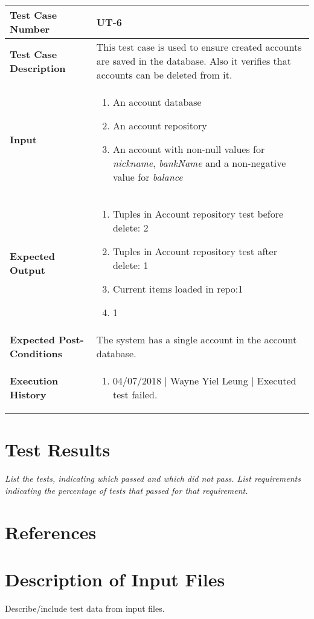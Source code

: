\documentclass[12pt]{article}
\begin{document}
\begin{table}[htbp]
\centering
\label{UT-6}
\begin{tabularx}{\textwidth}{ | l | X |}
\hline
\textbf{Test Case Number}      &  UT-6                      \\ \hline
\textbf{Test Case Description}    &  This test case is used to ensure created accounts are saved in the database. Also it verifies that accounts can be deleted from it.                 \\ \hline
\textbf{Input}         & 	\begin{enumerate}
  
\item An account database
\item An account repository
\item An account with non-null values for \textit{nickname}, \textit{bankName} and a non-negative value for \textit{balance}
  
\end{enumerate} \\ \hline

\textbf{Expected Output}     & \begin{enumerate}
\item Tuples in Account repository test before delete: 2 
\item Tuples in Account repository test after delete: 1 
\item Current items loaded in repo:1 
\item 1

\end{enumerate} \\ \hline
\textbf{Expected Post-Conditions} & The system has a single account in the account database. \\
\hline
\textbf{Execution History}   &  \begin{enumerate}
	\item 04/07/2018 | Wayne Yiel Leung | Executed test failed.
\end {enumerate} \\ \hline
\end{tabularx}
\end{table}




\section{Test Results}

{\it
List the tests, indicating which passed and which did not pass.
List requirements indicating the percentage of tests that passed for that requirement.
}

\section{References}

\section{Description of Input Files}

Describe/include test data from input files.
\end{document}
